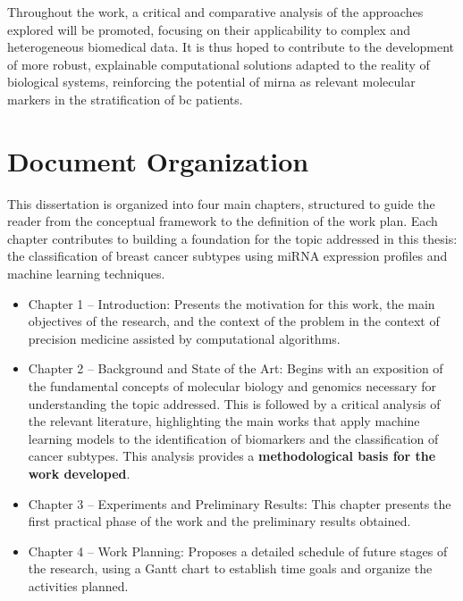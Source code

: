Throughout the work, a critical and comparative analysis of the approaches
explored will be promoted, focusing on their applicability to complex and
heterogeneous biomedical data. It is thus hoped to contribute to the
development of more robust, explainable computational solutions adapted to the
reality of biological systems, reinforcing the potential of \gls{mirna} as
relevant molecular markers in the stratification of \gls{bc} patients.

\section{Document Organization}
\label{sec:document-organization}

This dissertation is organized into four main chapters, structured to guide the
reader from the conceptual framework to the definition of the work plan. Each
chapter contributes to building a foundation for the topic addressed in this
thesis: the classification of breast cancer subtypes using miRNA expression
profiles and machine learning techniques.
\begin{itemize}
  \item Chapter 1 – Introduction: Presents the motivation for this work, the main
        objectives of the research, and the context of the problem in the context of
        precision medicine assisted by computational algorithms.

  \item Chapter 2 – Background and State of the Art: Begins with an exposition of the
        fundamental concepts of molecular biology and genomics necessary for
        understanding the topic addressed. This is followed by a critical analysis of
        the relevant literature, highlighting the main works that apply machine
        learning models to the identification of biomarkers and the classification of
        cancer subtypes. This analysis provides a \textbf{methodological basis for the
          work developed}.

  \item Chapter 3 – Experiments and Preliminary Results: This chapter presents the
        first practical phase of the work and the preliminary results obtained.

  \item Chapter 4 – Work Planning: Proposes a detailed schedule of future stages of the
        research, using a Gantt chart to establish time goals and organize the
        activities planned.
\end{itemize}

